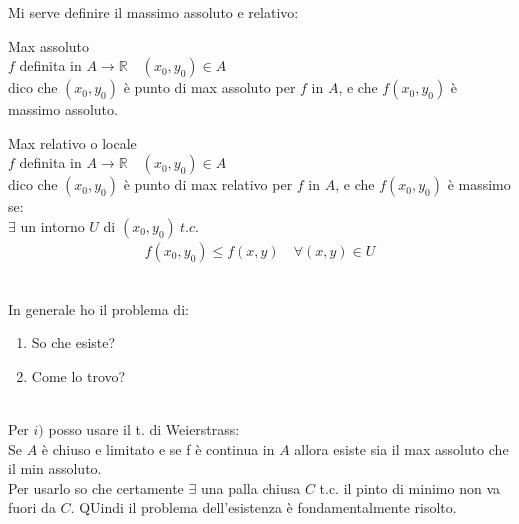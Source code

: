 \documentclass[a4paper, oneside]{article}
\begin{document}
            Mi serve definire il massimo assoluto e relativo:
            \begin{definition}
                Max assoluto\\
                $f$ definita in $A \to \mathbb{R} \quad (x_0,y_0) \in A$ \\
                dico che $(x_0,y_0)$ è punto di max assoluto per $f$ in $A$, e che $f(x_0,y_0)$ è massimo assoluto.\\ 
            \end{definition}
            \begin{definition}
                Max relativo o locale\\
                $f$ definita in $A \to \mathbb{R} \quad (x_0,y_0) \in A$ \\
                dico che $(x_0,y_0)$ è punto di max relativo per $f$ in $A$, e che $f(x_0,y_0)$ è massimo se:\\
                $\exists$ un intorno $U$ di $(x_0,y_0) \ t.c.$\\
                \begin{gather*}
                    f(x_0,y_0) \leq f(x,y) \quad \forall (x,y) \in U
                \end{gather*} 
            \end{definition}
        \hfil\\
        In generale ho il problema di:
        \begin{enumerate}[$i)$]
            \item So che esiste?
            \item Come lo trovo?
        \end{enumerate}            
        \hfil\\
        Per $i)$ posso usare il t. di Weierstrass:\\
        Se $A$ è chiuso e limitato e se f è continua in $A$ allora esiste sia il max assoluto che il min assoluto.\\
        Per usarlo so che certamente $\exists$ una palla chiusa $C$ t.c. il pinto di minimo non va fuori da $C$. QUindi il problema dell'esistenza è fondamentalmente risolto.\\
\end{document}
